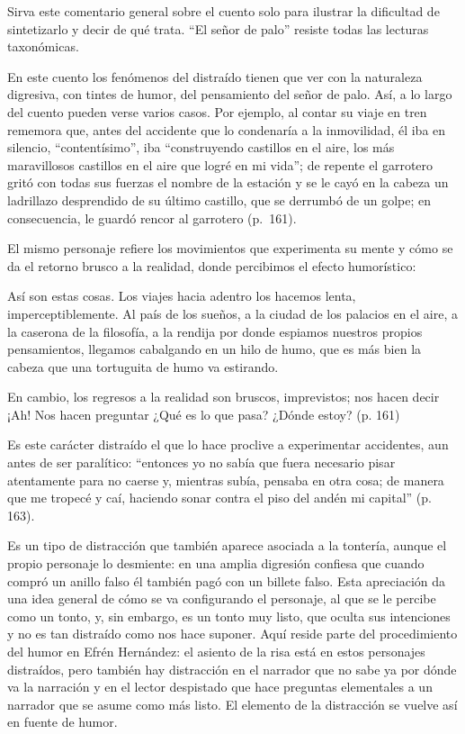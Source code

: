 \documentclass[14pt,twoside,final]{extbook} %
\begin{document}
Sirva este comentario general sobre el cuento solo para ilustrar la dificultad de sintetizarlo y decir de qué trata. ``El señor de palo'' resiste todas las lecturas taxonómicas.

En este cuento los fenómenos del distraído tienen que ver con la naturaleza digresiva, con tintes de humor, del pensamiento del señor de palo. Así, a lo largo del cuento pueden verse varios casos. Por ejemplo, al contar su viaje en tren rememora que, antes del accidente que lo condenaría a la inmovilidad, él iba en silencio, ``contentísimo'', iba ``construyendo castillos en el aire, los más maravillosos castillos en el aire que logré en mi vida''; de repente el garrotero gritó con todas sus fuerzas el nombre de la estación y se le cayó en la cabeza un ladrillazo desprendido de su último castillo, que se derrumbó de un golpe; en consecuencia, le guardó rencor al garrotero (p.~161).

El mismo personaje refiere los movimientos que experimenta su mente y cómo se da el retorno brusco a la realidad, donde percibimos el efecto humorístico:
\begin{quoting}
Así son estas cosas. Los viajes hacia adentro los hacemos lenta, imperceptiblemente. Al país de los sueños, a la ciudad de los palacios en el aire, a la caserona de la filosofía, a la rendija por donde espiamos nuestros propios pensamientos, llegamos cabalgando en un hilo de humo, que es más bien la cabeza que una tortuguita de humo va estirando.

En cambio, los regresos a la realidad son bruscos, imprevistos; nos hacen decir ¡Ah! Nos hacen preguntar ¿Qué es lo que pasa? ¿Dónde estoy? (p. 161)
\end{quoting}
Es este carácter distraído el que lo hace proclive a experimentar accidentes, aun antes de ser paralítico: ``entonces yo no sabía que fuera necesario pisar atentamente para no caerse y, mientras subía, pensaba en otra cosa; de manera que me tropecé y caí, haciendo sonar contra el piso del andén mi capital'' (p. 163).

Es un tipo de distracción que también aparece asociada a la tontería, aunque el propio personaje lo desmiente: en una amplia digresión confiesa que cuando compró un anillo falso él también pagó con un billete falso. Esta apreciación da una idea general de cómo se va configurando el personaje, al que se le percibe como un tonto, y, sin embargo, es un tonto muy listo, que oculta sus intenciones y no es tan distraído como nos hace suponer. Aquí reside parte del procedimiento del humor en Efrén Hernández: el asiento de la risa está en estos personajes distraídos, pero también hay distracción en el narrador que no sabe ya por dónde va la narración y en el lector despistado que hace preguntas elementales a un narrador que se asume como más listo. El elemento de la distracción se vuelve así en fuente de humor.
\end{document}
